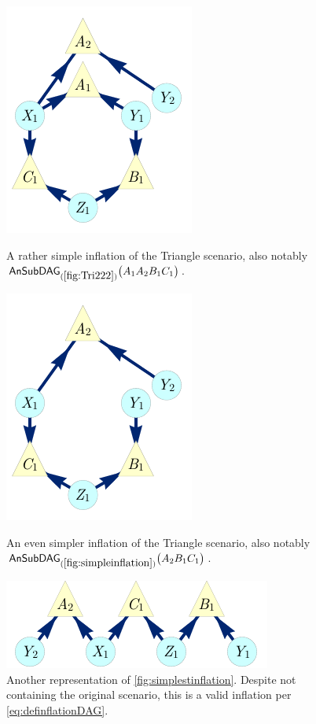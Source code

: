 \begin{figure}[hb]
\centering
\begin{minipage}[t]{0.3\linewidth}
\centering
\includegraphics[scale=1]{broadcastingexamplenohighlightALT.pdf}
\caption{A rather simple inflation of the Triangle scenario, also notably $\ansubgraph[(\cref{fig:Tri222})]{A_1 A_2 B_1 C_1}$.}\label{fig:simpleinflation}
\end{minipage}\hfill
\begin{minipage}[t]{0.275\linewidth}
\centering
\includegraphics[scale=1]{nobroadcastingexamplenohighlightALT.pdf}
\caption{An even simpler inflation of the Triangle scenario, also notably $\ansubgraph[(\cref{fig:simpleinflation})]{A_2 B_1 C_1}$. }\label{fig:simplestinflation}
\end{minipage}
\hfill
\begin{minipage}[t]{0.325\linewidth}
\centering
\includegraphics[scale=1]{TriDagSubA2B1C1.pdf}
\caption{Another representation of \cref{fig:simplestinflation}. Despite not containing the original scenario, this is a valid inflation per \cref{eq:definflationDAG}.}\label{fig:TriDagSubA2B1C1}
\end{minipage}
\end{figure}

